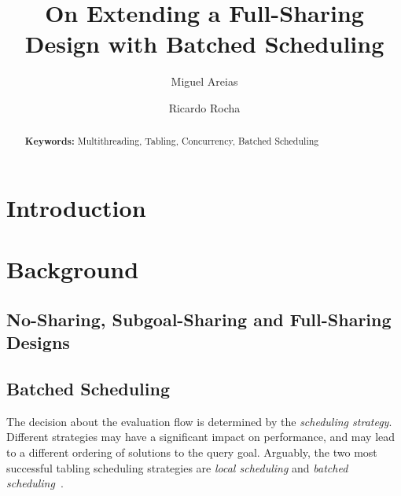 \documentclass{llncs}
\begin{document}
\title{On Extending a Full-Sharing Design with Batched Scheduling}

\author{Miguel Areias \and Ricardo Rocha}


\maketitle


\begin{abstract}

  \textbf{Keywords:} Multithreading, Tabling, Concurrency, Batched
  Scheduling
\end{abstract}


\section{Introduction}

\section{Background}

\subsection{No-Sharing, Subgoal-Sharing and Full-Sharing Designs}

\subsection{Batched Scheduling}

The decision about the evaluation flow is determined by the
\emph{scheduling strategy}. Different strategies may have a
significant impact on performance, and may lead to a different
ordering of solutions to the query goal. Arguably, the two most
successful tabling scheduling strategies are \emph{local scheduling}
and \emph{batched scheduling}~\cite{Freire-96}.
\end{document}
